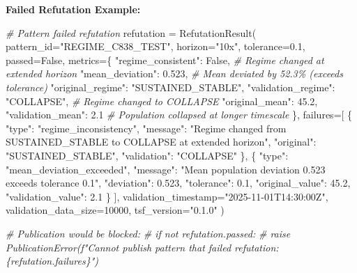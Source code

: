 \documentclass[
]{article}
\newenvironment{Shaded}{}{}
\newcommand{\CommentTok}[1]{\textcolor[rgb]{0.38,0.63,0.69}{\textit{#1}}}
\newcommand{\DecValTok}[1]{\textcolor[rgb]{0.25,0.63,0.44}{#1}}
\newcommand{\FloatTok}[1]{\textcolor[rgb]{0.25,0.63,0.44}{#1}}
\newcommand{\NormalTok}[1]{#1}
\newcommand{\OperatorTok}[1]{\textcolor[rgb]{0.40,0.40,0.40}{#1}}
\newcommand{\StringTok}[1]{\textcolor[rgb]{0.25,0.44,0.63}{#1}}
\newcommand{\VariableTok}[1]{\textcolor[rgb]{0.10,0.09,0.49}{#1}}
\begin{document}
\textbf{Failed Refutation Example:}

\begin{Shaded}
\begin{Highlighting}[]
\CommentTok{\# Pattern failed refutation}
\NormalTok{refutation }\OperatorTok{=}\NormalTok{ RefutationResult(}
\NormalTok{    pattern\_id}\OperatorTok{=}\StringTok{"REGIME\_C838\_TEST"}\NormalTok{,}
\NormalTok{    horizon}\OperatorTok{=}\StringTok{"10x"}\NormalTok{,}
\NormalTok{    tolerance}\OperatorTok{=}\FloatTok{0.1}\NormalTok{,}
\NormalTok{    passed}\OperatorTok{=}\VariableTok{False}\NormalTok{,}
\NormalTok{    metrics}\OperatorTok{=}\NormalTok{\{}
        \StringTok{"regime\_consistent"}\NormalTok{: }\VariableTok{False}\NormalTok{,        }\CommentTok{\# Regime changed at extended horizon}
        \StringTok{"mean\_deviation"}\NormalTok{: }\FloatTok{0.523}\NormalTok{,           }\CommentTok{\# Mean deviated by 52.3\% (exceeds tolerance)}
        \StringTok{"original\_regime"}\NormalTok{: }\StringTok{"SUSTAINED\_STABLE"}\NormalTok{,}
        \StringTok{"validation\_regime"}\NormalTok{: }\StringTok{"COLLAPSE"}\NormalTok{,   }\CommentTok{\# Regime changed to COLLAPSE}
        \StringTok{"original\_mean"}\NormalTok{: }\FloatTok{45.2}\NormalTok{,}
        \StringTok{"validation\_mean"}\NormalTok{: }\FloatTok{2.1}             \CommentTok{\# Population collapsed at longer timescale}
\NormalTok{    \},}
\NormalTok{    failures}\OperatorTok{=}\NormalTok{[}
\NormalTok{        \{}
            \StringTok{"type"}\NormalTok{: }\StringTok{"regime\_inconsistency"}\NormalTok{,}
            \StringTok{"message"}\NormalTok{: }\StringTok{"Regime changed from SUSTAINED\_STABLE to COLLAPSE at extended horizon"}\NormalTok{,}
            \StringTok{"original"}\NormalTok{: }\StringTok{"SUSTAINED\_STABLE"}\NormalTok{,}
            \StringTok{"validation"}\NormalTok{: }\StringTok{"COLLAPSE"}
\NormalTok{        \},}
\NormalTok{        \{}
            \StringTok{"type"}\NormalTok{: }\StringTok{"mean\_deviation\_exceeded"}\NormalTok{,}
            \StringTok{"message"}\NormalTok{: }\StringTok{"Mean population deviation 0.523 exceeds tolerance 0.1"}\NormalTok{,}
            \StringTok{"deviation"}\NormalTok{: }\FloatTok{0.523}\NormalTok{,}
            \StringTok{"tolerance"}\NormalTok{: }\FloatTok{0.1}\NormalTok{,}
            \StringTok{"original\_value"}\NormalTok{: }\FloatTok{45.2}\NormalTok{,}
            \StringTok{"validation\_value"}\NormalTok{: }\FloatTok{2.1}
\NormalTok{        \}}
\NormalTok{    ],}
\NormalTok{    validation\_timestamp}\OperatorTok{=}\StringTok{"2025{-}11{-}01T14:30:00Z"}\NormalTok{,}
\NormalTok{    validation\_data\_size}\OperatorTok{=}\DecValTok{10000}\NormalTok{,}
\NormalTok{    tsf\_version}\OperatorTok{=}\StringTok{"0.1.0"}
\NormalTok{)}

\CommentTok{\# Publication would be blocked:}
\CommentTok{\# if not refutation.passed:}
\CommentTok{\#     raise PublicationError(f"Cannot publish pattern that failed refutation: \{refutation.failures\}")}
\end{Highlighting}
\end{Shaded}
\end{document}
